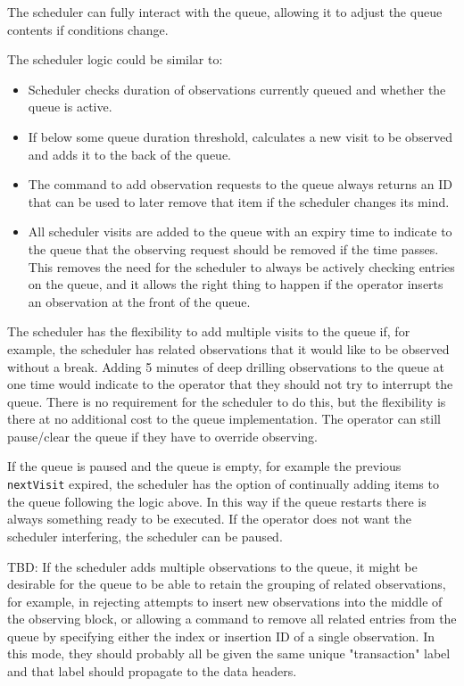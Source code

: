 \documentclass[TS,toc,lsstdraft]{lsstdoc}
\begin{document}
The scheduler can fully interact with the queue, allowing it to adjust the queue contents if conditions change.

The scheduler logic could be similar to:

\begin{itemize}

\item Scheduler checks duration of observations currently queued and whether the queue is active.

\item If below some queue duration threshold, calculates a new visit to be observed and adds it to the back of the queue.

\item The command to add observation requests to the queue always returns an ID that can be used to later remove that item if the scheduler changes its mind.

\item All scheduler visits are added to the queue with an expiry time to indicate to the queue that the observing request should be removed if the time passes.
This removes the need for the scheduler to always be actively checking entries on the queue, and it allows the right thing to happen if the operator inserts an observation at the front of the queue.

\end{itemize}

The scheduler has the flexibility to add multiple visits to the queue if, for example, the scheduler has related observations that it would like to be observed without a break.
Adding 5 minutes of deep drilling observations to the queue at one time would indicate to the operator that they should not try to interrupt the queue.
There is no requirement for the scheduler to do this, but the flexibility is there at no additional cost to the queue implementation.
The operator can still pause/clear the queue if they have to override observing.

If the queue is paused and the queue is empty, for example the previous \texttt{nextVisit} expired, the scheduler has the option of continually adding items to the queue following the logic above.
In this way if the queue restarts there is always something ready to be executed.
If the operator does not want the scheduler interfering, the scheduler can be paused.

TBD: If the scheduler adds multiple observations to the queue, it might be desirable for the queue to be able to retain the grouping of related observations, for example, in rejecting attempts to insert new observations into the middle of the observing block, or allowing a command to remove all related entries from the queue by specifying either the index or insertion ID of a single observation.
In this mode, they should probably all be given the same unique "transaction" label and that label should propagate to the data headers.
\end{document}
